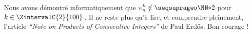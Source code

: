 Nous avons démontré informatiquement que $\consprod \notin \NNssquare$ pour $k \in \ZintervalC{2}{100}$\,. Il ne reste plus qu'à lire, et comprendre pleinement, l'article \emph{\enquote{Note on Products of Consecutive Integers}} de Paul Erdős. Bon courage !
